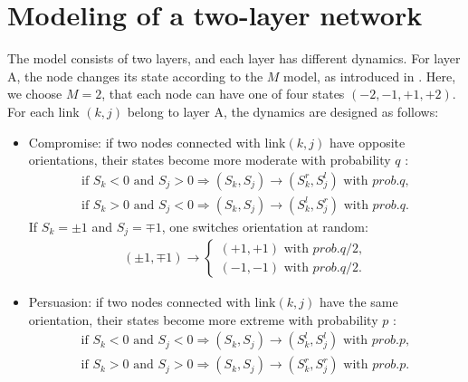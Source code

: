 \section{Modeling of a two-layer network}
\label{sec:modeling of two layer network}
The model consists of two layers, and each layer has different dynamics. For layer A, the node changes its state according to the $M$ model, as introduced in \parencite{rocca2014}. Here, we choose $M=2$, that each node can have one of four states $(-2, -1, +1, +2)$. For each link $(k, j)$ belong to layer A,  the dynamics are designed as follows:
\begin{itemize}
	\item Compromise: if two nodes connected with link$(k, j)$ have opposite orientations, their states become more moderate with probability $q$ :
	\begin{align}
	\mbox{if } S_k<0 \mbox{ and } S_j>0  \Rightarrow (S_k, S_j) \rightarrow (S_k^r, S_j^l) \mbox{ with } prob.q,\\
	\mbox{if } S_k>0 \mbox{ and } S_j<0  \Rightarrow (S_k, S_j) \rightarrow (S_k^l, S_j^r) \mbox{ with } prob.q.
	\end{align}
	If $S_k = \pm1$ and $S_j = \mp1$, one switches orientation at random:
	\begin{align}
	(\pm 1, \mp 1)\rightarrow \left\{\begin{matrix}
	(+1, +1) \mbox{ with } prob.q/2,
	\\(-1, -1)\mbox{ with } prob.q/2.
	\end{matrix}\right.
	\end{align}
		
	\item Persuasion: if two nodes connected with link$(k, j)$ have the same orientation, their states become more extreme with probability $p$ :
	\begin{align}
	\mbox{if } S_k<0 \mbox{ and } S_j<0  \Rightarrow (S_k, S_j) \rightarrow (S_k^l, S_j^l) \mbox{ with } prob.p,\\
	\mbox{if } S_k>0 \mbox{ and } S_j>0  \Rightarrow (S_k, S_j) \rightarrow (S_k^r, S_j^r) \mbox{ with } prob.p.
	\end{align}
\end{itemize}

